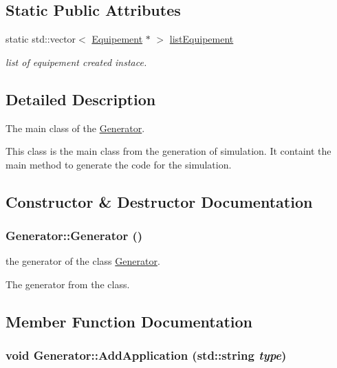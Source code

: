 \subsection*{Static Public Attributes}
\begin{CompactItemize}
\item 
static std::vector$<$ \hyperlink{class_equipement}{Equipement} $\ast$ $>$ \hyperlink{class_generator_96d452a5ef951497a37baf86e35b50f6}{listEquipement}
\begin{CompactList}\small\item\em list of equipement created instace. \item\end{CompactList}\end{CompactItemize}


\subsection{Detailed Description}
The main class of the \hyperlink{class_generator}{Generator}. 

This class is the main class from the generation of simulation. It containt the main method to generate the code for the simulation. 

\subsection{Constructor \& Destructor Documentation}
\hypertarget{class_generator_aaf1e5f3a47ede3ef8a96a301ee04a10}{
\subsubsection[{Generator}]{\setlength{\rightskip}{0pt plus 5cm}Generator::Generator ()}}
\label{class_generator_aaf1e5f3a47ede3ef8a96a301ee04a10}


the generator of the class \hyperlink{class_generator}{Generator}. 

The generator from the class. 

\subsection{Member Function Documentation}
\hypertarget{class_generator_bd0054d3e88aaeda093ac882861d6410}{
\subsubsection[{AddApplication}]{\setlength{\rightskip}{0pt plus 5cm}void Generator::AddApplication (std::string {\em type})}}
\label{class_generator_bd0054d3e88aaeda093ac882861d6410}


